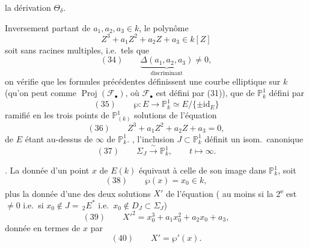 \documentclass[11pt,a4paper]{article}
\begin{document}
la dérivation $\Theta_\delta$.

Inversement partant de $a_1, a_2, a_3 \in k$, 
 le polynôme
\[
  Z^3 + a_1 Z^2 + a_2 Z + a_3 \in k[Z]
\]
soit sans racines multiples, i.e.\ tels que
\[
  (34) \qquad \underbrace{\Delta(a_1, a_2, a_3)}_{\text{discriminant}} \neq 0 ,
\]
on vérifie que les formules précédentes définissent une courbe elliptique sur $k$
(qu'on peut   comme \ill{} $\operatorname{Proj}(\mathcal{F}_\bullet)$,
où $\mathcal{F}_\bullet$ est défini par (31)), \struck{\ill{}} \add{\ill{}} que
   de
$\mathbb{P}^1_k$ défini par
\[
  (35) \qquad \wp : E \longrightarrow \mathbb{P}^1_k \simeq E/\{\pm \mathrm{id}_E\}
\]
ramifié en  les trois points  de
$\mathbb{P}^1_{(k)}$  \struck{\ill{}} solutions de l'équation
\[
  (36) \qquad Z^3 + a_1 Z^2 + a_2 Z + a_3 = 0 ,
\]
   de $E$
étant au-dessus de   $\infty$ de
$\mathbb{P}^1_k$.  \add{\ill{}}, l'inclusion $J \subset \mathbb{P}^1_k$
définit un isom.\ canonique
\[
  (37) \qquad \Sigma_J \xrightarrow{\;\sim\;} \mathbb{P}^1_k , \qquad t \mapsto \infty .
\]

. La donnée d'un point $x$  de $E(k)$ équivaut à celle de son image
dans $\mathbb{P}^1_k$, soit 
\[
  (38) \qquad \wp(x) = x_0 \in k ,
\]
plus la donnée d'une des deux solutions $X'$ de l'équation (
au moins si la 2\textsuperscript{e}  est $\neq 0$ i.e.\ si
$x_0 \notin J =\, _2E^*$ i.e.\ $x_0 \notin D_J \subset \Sigma_J$)
\[
  (39) \qquad X'^2 = x_0^3 + a_1 x_0^2 + a_2 x_0 + a_3 ,
\]
donnée en termes de $x$ par
\[
  (40) \qquad X' = \wp'(x) .
\]
\end{document}
